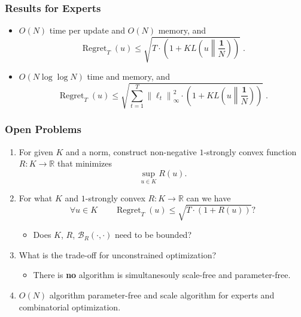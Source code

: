 \documentclass[usenames,dvipsnames]{beamer}
\DeclareMathOperator{\Regret}{Regret}
\newcommand{\R}{\mathbb{R}}
\newcommand{\norm}[1]{\left\|#1\right\|}
\newcommand{\KL}[2]{KL\left({#1}\middle\|{#2}\right)}
\newcommand{\Breg}{\mathcal{B}}
\begin{document}
\begin{frame}
\frametitle{Results for Experts}

\begin{itemize}
\item $O(N)$ time per update and $O(N)$ memory, and
$$
\Regret_T(u) \le \sqrt{T \cdot \left(1 + \KL{u}{\frac{\textbf{1}}{N}} \right)} \; .
$$

\item $O(N \log \log N)$ time and memory, and
$$
\Regret_T(u) \le \sqrt{ \sum_{t=1}^T \norm{\ell_t}_\infty^2 \cdot \left(1 + \KL{u}{\frac{\textbf{1}}{N}} \right)} \; .
$$
\end{itemize}
\end{frame}

\begin{frame}
\frametitle{Open Problems}

\begin{enumerate}
\item For given $K$ and a norm, construct non-negative $1$-strongly convex
function $R:K \to \R$ that minimizes
$$
\sup_{u \in K} R(u).
$$

\item For what $K$ and $1$-strongly convex $R:K \to \R$ can we have
$$
\forall u \in K \qquad \Regret_T(u) \le \sqrt{T \cdot (1 + R(u))} ?
$$

\begin{itemize}
\item Does $K$, $R$, $\Breg_R(\cdot,\cdot)$ need to be bounded?
\end{itemize}

\item What is the trade-off for unconstrained optimization?

\begin{itemize}
\item There is \textbf{no} algorithm is simultanesouly scale-free
and parameter-free.
\end{itemize}

\item $O(N)$ algorithm parameter-free and scale algorithm
for experts and combinatorial optimization.
\end{enumerate}

\end{frame}
\end{document}
